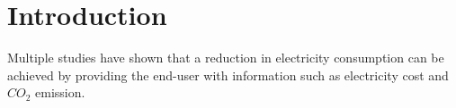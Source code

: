 \documentclass[Main]{subfiles}
\begin{document}
\section{Introduction} %
\label{sec:introduction}
Multiple studies have shown that a reduction in electricity consumption can be achieved by providing the end-user with information such as electricity cost and $CO_2$ emission. 

\cite{Doe:2009:Online}

\end{document}
